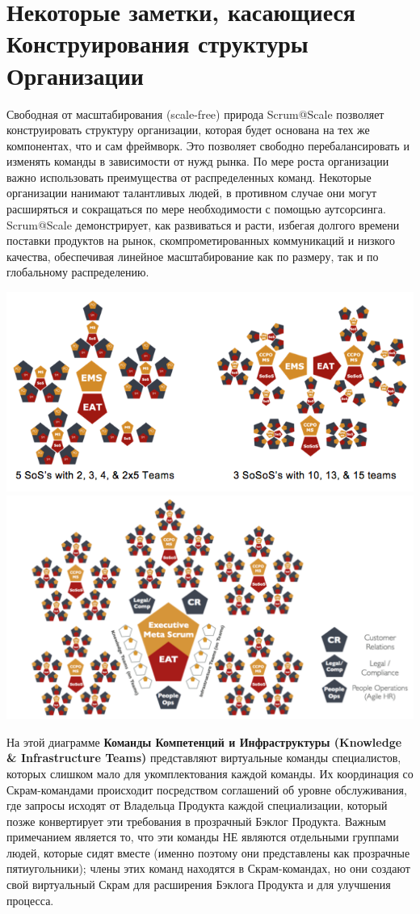 \documentclass[12pt,a4paper,parskip=full]{scrartcl}
\begin{document}
\section{Некоторые заметки, касающиеся Конструирования структуры Организации}

Свободная от масштабирования (scale-free) природа Scrum@Scale позволяет конструировать структуру организации, которая будет основана на тех же компонентах, что и сам фреймворк. Это позволяет свободно перебалансировать и изменять команды в зависимости от нужд рынка. По мере роста организации важно использовать преимущества от распределенных команд. Некоторые организации нанимают талантливых людей, в противном случае они могут расширяться и сокращаться по мере необходимости с помощью аутсорсинга. Scrum@Scale демонстрирует, как развиваться и расти, избегая долгого времени поставки продуктов на рынок, скомпрометированных  коммуникаций и низкого качества, обеспечивая линейное масштабирование как по размеру, так и по глобальному распределению. 

\includegraphics[width=1.0\linewidth]{VariableSoS-R2.png}
\includegraphics[width=1.0\linewidth]{OrganizationalDiagram.png}

На этой диаграмме  \textbf{Команды Компетенций и Инфраструктуры (Knowledge \& Infrastructure Teams)} представляют виртуальные команды специалистов, которых слишком мало для укомплектования каждой команды. Их координация со Скрам-командами происходит посредством соглашений об уровне обслуживания, где запросы исходят от Владельца Продукта каждой специализации, который позже конвертирует эти требования в прозрачный Бэклог Продукта. Важным примечанием является то, что эти команды НЕ являются отдельными группами людей, которые сидят вместе (именно поэтому они представлены как прозрачные пятиугольники); члены этих команд находятся в Скрам-командах, но они создают свой виртуальный Скрам для расширения Бэклога Продукта и для улучшения процесса. 
\end{document}
